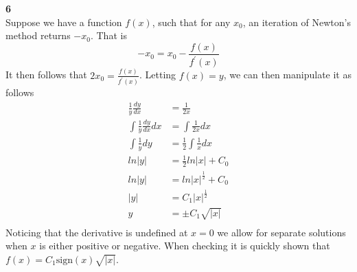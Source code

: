 \documentclass[12pt]{article}
\newcommand{\problem}[1]{\hspace{-4 ex} \large \textbf{#1}\\}
\begin{document}
	
	
	
	
\problem{6} 
	Suppose we have a function $f(x)$, such that for any $x_0$, an iteration of Newton's method returns $-x_0$. That is 
	$$
	-x_0 = x_0 - \frac{f(x)}{f^\prime(x)}
	$$
	It then follows that $2x_0 = \frac{f(x)}{f^\prime(x)}$. Letting $f(x)=y$, we can then manipulate it as follows
	\begin{align*}
		\frac{1}{y}\frac{dy}{dx} & = \frac{1}{2x} \\
		\int \frac{1}{y}\frac{dy}{dx} dx & = \int \frac{1}{2x} dx \\
		\int \frac{1}{y}dy & = \frac{1}{2}\int \frac{1}{x} dx \\
		ln\vert y \vert & = \frac{1}{2} ln\vert x \vert + C_0 \\
		ln\vert y \vert & = ln\vert x \vert^\frac{1}{2} + C_0 \\
		\vert y \vert & = C_1 \vert x \vert^\frac{1}{2} \\
		y & = \pm C_1 \sqrt{\vert x \vert} \\
	\end{align*}
	Noticing that the derivative is undefined at $x=0$ we allow for separate solutions when $x$ is either positive or negative. When checking it is quickly shown that $f(x)=C_1 \text{sign}(x)\sqrt{\vert x \vert}$.
\end{document}
